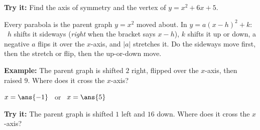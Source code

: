 \documentclass[12pt]{article}
\begin{document}
\begin{tryitbox}
\textbf{Try it:} \quad Find the axis of symmetry and the vertex of $y = x^2 + 6x + 5$.\\[2pt]
\end{tryitbox}


\begin{formulabox}
Every parabola is the parent graph $y = x^2$ moved about. In $y = a(x-h)^2 + k$: \ $h$ shifts it sideways (\emph{right} when the bracket says $x - h$), $k$ shifts it up or down, a negative $a$ flips it over the $x$-axis, and $|a|$ stretches it. Do the sideways move first, then the stretch or flip, then the up-or-down move.
\end{formulabox}

\begin{examplebox}
\textbf{Example:} \quad The parent graph is shifted $2$ right, flipped over the $x$-axis, then raised $9$. Where does it cross the $x$-axis?
\par
$x = \ans{-1}$ \ or \ $x = \ans{5}$
\end{examplebox}

\begin{tryitbox}
\textbf{Try it:} \quad The parent graph is shifted $1$ left and $16$ down. Where does it cross the $x$-axis?\\[2pt]
\end{tryitbox}
\end{document}
